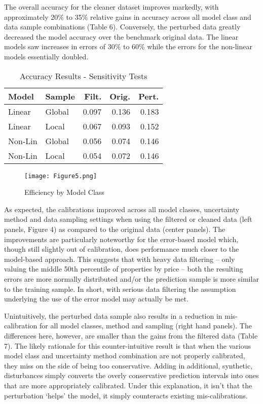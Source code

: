 \documentclass[colTwo]{format}
\theoremstyle{definition}
\begin{document}
The overall accuracy for the cleaner dataset improves markedly, with approximately 20\% to 35\% relative gains in accuracy across all model class and data sample combinations (Table 6).  Conversely, the perturbed data greatly decreased the model accuracy over the benchmark original data.  The linear models saw increases in errors of 30\% to 60\% while the errors for the non-linear models essentially doubled.  

\begin{table}[h]
\centering
\begin{tabular}{l|l|r|r|r}
\hline
\textbf{Model} & \textbf{Sample} & \textbf{Filt.} & \textbf{Orig.} & \textbf{Pert.}\\
\hline
Linear & Global & 0.097 & 0.136 & 0.183\\
Linear & Local & 0.067 & 0.093 & 0.152\\
\hline
Non-Lin & Global & 0.056 & 0.074 & 0.146\\
Non-Lin & Local & 0.054 & 0.072 & 0.146\\
\hline
\end{tabular}
\caption{Accuracy Results - Sensitivity Tests}
\label{table:6}
\end{table}

\begin{figure*}[h!]
\centering
\texttt{[image: Figure5.png]}
\caption{Efficiency by Model Class}
\label{fig:effmod}
\end{figure*}

As expected, the calibrations improved across all model classes, uncertainty method and data sampling settings when using the filtered or cleaned data (left panels, Figure 4) as compared to the original data (center panels).  The improvements are particularly noteworthy for the error-based model which, though still slightly out of calibration, does performance much closer to the model-based approach. This suggests that with heavy data filtering -- only valuing the middle 50th percentile of properties by price -- both the resulting errors are more normally distributed and/or the prediction sample is more similar to the training sample.  In short, with serious data filtering the assumption underlying the use of the error model may actually be met.

Unintuitively, the perturbed data sample also results in a reduction in mis-calibration for all model classes, method and sampling (right hand panels).  The differences here, however, are smaller than the gains from the filtered data (Table 7).  The likely rationale for this counter-intuitive result is that when the various model class and uncertainty method combination are not properly calibrated, they miss on the side of being too conservative.  Adding in additional, synthetic, disturbances simply converts the overly conservative prediction intervals into ones that are more appropriately calibrated.  Under this explanation, it isn’t that the perturbation ‘helps’ the model, it simply counteracts existing mis-calibrations.  
\end{document}
